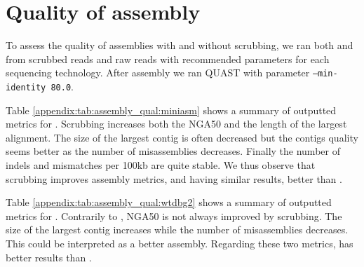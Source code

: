 \documentclass[../../main.tex]{subfiles}
\begin{document}
%
%
%

 
\newpage
\section{Quality of assembly}\label{appendix:assembly_qual}

To assess the quality of assemblies with and without scrubbing, we ran both \miniasm and \wtdbg from scrubbed reads and raw reads with recommended parameters for each sequencing technology. After assembly we ran QUAST with parameter \texttt{--min-identity 80.0}. 


Table \ref{appendix:tab:assembly_qual:miniasm} shows a summary of outputted metrics for \miniasm. Scrubbing increases both the NGA50 and the length of the largest alignment. The size of the largest contig is often decreased but the contigs quality seems better as the number of misassemblies decreases. Finally the number of indels and mismatches per 100kb are quite stable. We thus observe that scrubbing improves assembly metrics, \yacrd and \dascrubber having similar results, better than \miniscrub. 
    
Table \ref{appendix:tab:assembly_qual:wtdbg2} shows a summary of outputted metrics for \wtdbg. Contrarily to \miniasm, NGA50 is not always improved by scrubbing.  The size of the largest contig increases while the number of misassemblies decreases. This could be interpreted as a better assembly. Regarding these two metrics, \yacrd has better results than \dascrubber.
\end{document}
